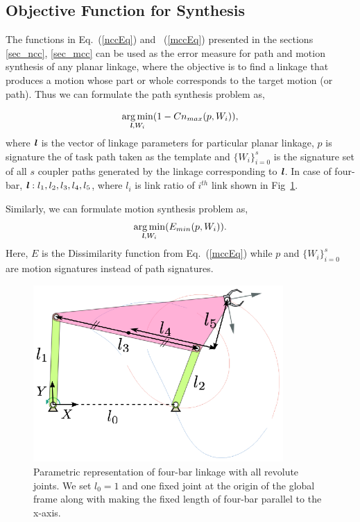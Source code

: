 \documentclass[twocolumn,10pt]{asme2ej}
\newcommand{\req}[1]{(\ref{#1})}
\DeclareMathOperator*{\argminA}{arg\,min}
\begin{document}
\subsection{Objective Function for Synthesis}
The functions in Eq.~\req{nccEq} and ~\req{mccEq} presented in the sections \ref{sec_ncc}, \ref{sec_mcc} can be used as the error measure for path and motion synthesis of any planar linkage, where the objective is to find a linkage that produces a motion whose part or whole corresponds to the target motion (or path).
Thus we can formulate the path synthesis problem as,

\begin{equation}\label{objectiveFunPath}
  \argminA_{\textbf{\emph{l}}, W_i} (1 - Cn_{max}(p, W_i)),
\end{equation}
where $\textbf{\emph{l}}$ is the vector of linkage parameters for particular planar linkage, $p$ is signature the of task path taken as the template and ${\{W_i\}}_{i=0}^{s}$ is the signature set of all $s$ coupler paths generated by the linkage corresponding to $\textbf{\emph{l}}$.
In case of four-bar, $\textbf{\emph{l}}: l_1, l_2, l_3, l_4, l_5$, where $l_i$ is link ratio of $i^{th}$ link shown in Fig~\ref{fourbar}.

Similarly, we can formulate motion synthesis problem as,
\begin{equation}\label{objectiveFunMotion}
  \argminA_{\textbf{\emph{l}}, W_i} (E_{min}(p, W_i)).
\end{equation}
Here, $E$ is the Dissimilarity function from Eq.~\req{mccEq} while $p$ and ${\{W_i\}}_{i=0}^{s}$ are motion signatures instead of path signatures.

\begin{figure}
\centering
\includegraphics[width=270pt]{figure/fig_fourbar.eps}
  \caption{Parametric representation of four-bar linkage with all revolute joints. We set $l_0 = 1$ and one fixed joint at the origin of the global frame along with making the fixed length of four-bar parallel to the x-axis.}
\label{fourbar}
\end{figure}
\end{document}
